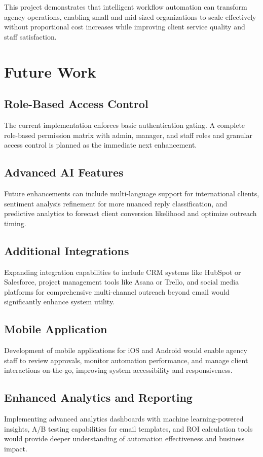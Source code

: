 \documentclass[12pt,a4paper]{report}
\begin{document}
This project demonstrates that intelligent workflow automation can transform agency operations, enabling small and mid-sized organizations to scale effectively without proportional cost increases while improving client service quality and staff satisfaction.

\section{Future Work}

\subsection{Role-Based Access Control}
The current implementation enforces basic authentication gating. A complete role-based permission matrix with admin, manager, and staff roles and granular access control is planned as the immediate next enhancement.

\subsection{Advanced AI Features}
Future enhancements can include multi-language support for international clients, sentiment analysis refinement for more nuanced reply classification, and predictive analytics to forecast client conversion likelihood and optimize outreach timing.

\subsection{Additional Integrations}
Expanding integration capabilities to include CRM systems like HubSpot or Salesforce, project management tools like Asana or Trello, and social media platforms for comprehensive multi-channel outreach beyond email would significantly enhance system utility.

\subsection{Mobile Application}
Development of mobile applications for iOS and Android would enable agency staff to review approvals, monitor automation performance, and manage client interactions on-the-go, improving system accessibility and responsiveness.

\subsection{Enhanced Analytics and Reporting}
Implementing advanced analytics dashboards with machine learning-powered insights, A/B testing capabilities for email templates, and ROI calculation tools would provide deeper understanding of automation effectiveness and business impact.
\end{document}
